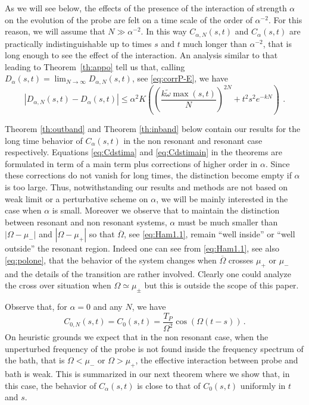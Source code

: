 \documentclass[11pt]{article}
\numberwithin{equation}{section}
\def\red{\textcolor{red}}
\def\red{}
\numberwithin{theorem}{section}
\def\tilde#1{\widetilde{#1}}
\begin{document}
As we will see below, the effects of the presence of the interaction of strength $\alpha$
on the evolution of the probe are felt on a time scale of the order of $\alpha^{-2}$. For this reason, we will assume
that $N\gg\alpha^{-2}$. In this way $C_{\alpha,N}(s,t)$ and $C_{\alpha}(s,t)$ are practically indistinguishable up to
times $s$ and $t$ much longer than $\alpha^{-2}$, that is long enough to see the effect of the interaction. An analysis
similar to that leading to Theorem~\ref{th:appo} tell us that, calling
$D_\alpha(s,t)=\lim_{N\to\infty}D_{\alpha,N}(s,t)$, see \eqref{eq:corrP-E}, we have
\[
\left |D_{\alpha,N}(s,t)-D_\alpha(s,t)\right|\leq \alpha^2
K\left(\left(\frac{k\tilde\omega\max(s,t)}{N}\right)^{2N}+t^2s^2e^{-kN}\right)\,\ .
\]

\red{Theorem \ref{th:outband} and Theorem \ref{th:inband} below contain our results for the long time behavior of
$C_\alpha(s,t)$ in the non resonant and resonant case respectively. Equations \ref{eq:Cdstima} and \eqref{eq:Cdstimain}
in the theorems are formulated in term of a main term plus corrections of higher order in $\alpha$. Since these
corrections do not vanish for long times, the distinction become empty if $\alpha$ is too large. Thus, notwithstanding
our results and methods are not based on weak limit or a perturbative scheme on $\alpha$, we will be mainly interested
in the case when $\alpha$ is small. Moreover we observe that to maintain the distinction between resonant and non
resonant systems, $\alpha$ must be much smaller than $|\Omega-\mu_-|$ and $|\Omega-\mu_+|$ so that $\overline \Omega$,
see \eqref{eq:Ham1.1}, remain ``well inside'' or ``well outside'' the resonant region. Indeed one can see from
\eqref{eq:Ham1.1},  see also \eqref{eq:polone}, that the behavior of the system changes when $\overline \Omega$ crosses
$\mu_+$ or $\mu_-$ and the details of the transition are rather involved. Clearly one could analyze the cross over
situation when $\Omega\simeq\mu_\pm$ but this is outside the scope of this paper.}


Observe that, for $\alpha=0$ and any $N$, we have
\[
 C_{0,N}(s,t)=C_0(s,t)=\frac{T_P}{\Omega^2}\cos(\Omega(t-s))\, .
\]
On heuristic grounds we expect that in the non resonant case, when the unperturbed frequency of the probe is not found
inside the frequency spectrum of the bath, that is  $\Omega<\mu_-$ or $\Omega>\mu_+$, the effective interaction between
probe and bath is weak. This is summarized in our next theorem where we show that, in this case, the behavior of
$C_\alpha(s,t)$ is close to that of $C_0(s,t)$ uniformly in $t$ and $s$.
\end{document}
